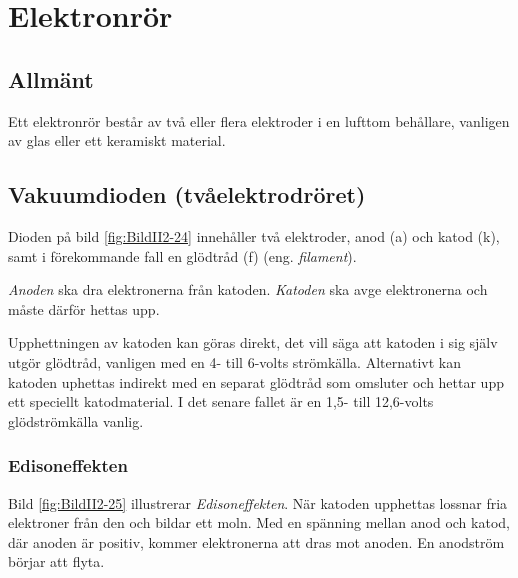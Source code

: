 \section{Elektronrör}
\label{elektronrör}

\subsection{Allmänt}

Ett elektronrör består av två eller flera elektroder i en lufttom behållare,
vanligen av glas eller ett keramiskt material.


\subsection{Vakuumdioden (tvåelektrodröret)}
\label{vakuumdioden}

Dioden på bild \ref{fig:BildII2-24} innehåller två elektroder,
anod (a) och katod (k), samt i förekommande fall en glödtråd (f)
(eng. \emph{filament}).

\emph{Anoden} ska dra elektronerna från katoden.
\emph{Katoden} ska avge elektronerna och måste därför hettas upp.

Upphettningen av katoden kan göras direkt, det vill säga att katoden i sig
själv utgör glödtråd, vanligen med en 4- till 6-volts strömkälla.
Alternativt kan katoden uphettas indirekt med en separat glödtråd som omsluter
och hettar upp ett speciellt katodmaterial.
I det senare fallet är en 1,5- till 12,6-volts glödströmkälla vanlig.


\subsubsection{Edisoneffekten}

Bild \ref{fig:BildII2-25} illustrerar \emph{Edisoneffekten}.
När katoden upphettas lossnar fria elektroner från den och bildar ett moln.
Med en spänning mellan anod och katod, där anoden är positiv, kommer
elektronerna att dras mot anoden.
En anodström börjar att flyta.

